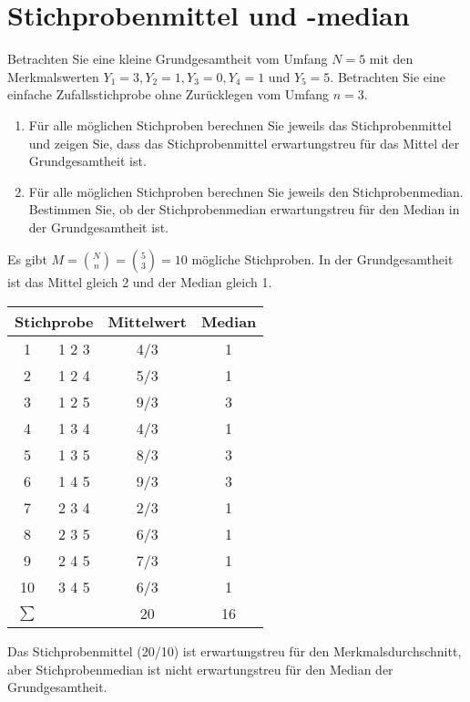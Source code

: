 \documentclass{article}
\begin{document}
\section{Stichprobenmittel und -median}
Betrachten Sie eine kleine Grundgesamtheit vom Umfang $N=5$ mit den Merkmalswerten $Y_1=3, Y_2=1,Y_3=0,Y_4=1$ und $Y_5=5$. Betrachten Sie eine einfache Zufallsstichprobe ohne Zur\"{u}cklegen vom Umfang $n=3$.
\begin{enumerate}
	\item F\"{u}r alle m\"{o}glichen Stichproben berechnen Sie jeweils das Stichprobenmittel und zeigen Sie, dass das Stichprobenmittel erwartungstreu f\"{u}r das Mittel der Grundgesamtheit ist.
	\item F\"{u}r alle m\"{o}glichen Stichproben berechnen Sie jeweils den Stichprobenmedian. Bestimmen Sie, ob der Stichprobenmedian erwartungstreu f\"{u}r den Median in der Grundgesamtheit ist.
\end{enumerate}
\begin{solution}
Es gibt $M=\binom{N}{n} = \binom{5}{3} = 10$ mögliche Stichproben. In der Grundgesamtheit ist das Mittel gleich 2 und der Median gleich 1.
\begin{center}
\begin{tabular}{|c|c|c|c|}
	\hline 
	\multicolumn{2}{|c|}{Stichprobe} & Mittelwert & Median \\ 
	\hline 
	1 & 1 2 3 & 4/3 & 1 \\ 
	\hline 
	2 & 1 2 4 & 5/3 & 1 \\ 
	\hline 
	3 & 1 2 5 & 9/3 & 3 \\ 
	\hline 
	4 & 1 3 4 & 4/3 & 1 \\ 
	\hline 
	5 & 1 3 5 & 8/3 & 3 \\ 
	\hline 
	6 & 1 4 5 & 9/3 & 3 \\ 
	\hline 
	7 & 2 3 4 & 2/3 & 1 \\ 
	\hline 
	8 & 2 3 5 & 6/3 & 1 \\ 
	\hline 
	9 & 2 4 5 & 7/3 & 1 \\ 
	\hline 
	10 & 3 4 5 & 6/3 & 1 \\ 
	\hline 
	$\sum$ &  & 20 & 16 \\ 
	\hline 
\end{tabular} 
\end{center}
Das Stichprobenmittel (20/10) ist erwartungstreu für den Merkmalsdurchschnitt, aber Stichprobenmedian ist nicht erwartungstreu für den Median der Grundgesamtheit.
\end{solution}
\end{document}
